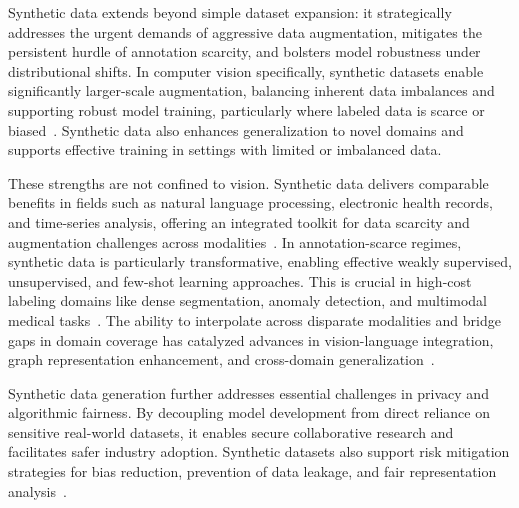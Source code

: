 \documentclass[sigconf]{acmart}
\begin{document}
Synthetic data extends beyond simple dataset expansion: it strategically addresses the urgent demands of aggressive data augmentation, mitigates the persistent hurdle of annotation scarcity, and bolsters model robustness under distributional shifts. In computer vision specifically, synthetic datasets enable significantly larger-scale augmentation, balancing inherent data imbalances and supporting robust model training, particularly where labeled data is scarce or biased~\cite{ref5,ref6,ref10,ref13,ref14,ref15,ref16,ref17,ref18,ref19,ref21,ref22,ref24,ref25,ref26,ref27,ref28,ref30,ref31,ref32,ref34,ref41,ref43,ref45,ref51,ref52,ref53,ref54,ref55,ref59,ref61,ref62,ref63,ref64,ref65,ref74,ref75,ref81,ref82,ref89,ref90}. Synthetic data also enhances generalization to novel domains and supports effective training in settings with limited or imbalanced data.

These strengths are not confined to vision. Synthetic data delivers comparable benefits in fields such as natural language processing, electronic health records, and time-series analysis, offering an integrated toolkit for data scarcity and augmentation challenges across modalities~\cite{ref13,ref62,ref63,ref64,ref81}. In annotation-scarce regimes, synthetic data is particularly transformative, enabling effective weakly supervised, unsupervised, and few-shot learning approaches. This is crucial in high-cost labeling domains like dense segmentation, anomaly detection, and multimodal medical tasks~\cite{ref12,ref23,ref24,ref26,ref31,ref32,ref51,ref53,ref54,ref55,ref59,ref74,ref81}. The ability to interpolate across disparate modalities and bridge gaps in domain coverage has catalyzed advances in vision-language integration, graph representation enhancement, and cross-domain generalization~\cite{ref14,ref18,ref64,ref81,ref89,ref90}.

Synthetic data generation further addresses essential challenges in privacy and algorithmic fairness. By decoupling model development from direct reliance on sensitive real-world datasets, it enables secure collaborative research and facilitates safer industry adoption. Synthetic datasets also support risk mitigation strategies for bias reduction, prevention of data leakage, and fair representation analysis~\cite{ref43,ref51,ref52,ref62,ref87,ref88}.
\end{document}
